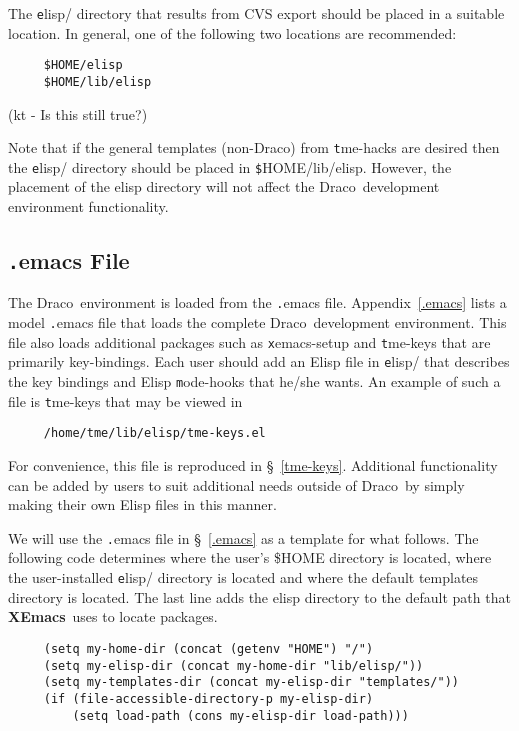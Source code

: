 \documentclass[11pt]{nmemo}
\newcommand{\comp}[1]{{\normalfont\texttt#1}}
\newcommand{\draco}{{\normalfont\sffamily Draco}}
\newcommand{\xemacs}{{\normalfont\bfseries XEmacs}}
\begin{document}
The \comp{elisp/} directory that results from CVS export should be
placed in a suitable location.  In general, one of the following two
locations are recommended:
\begin{verbatim}
     $HOME/elisp
     $HOME/lib/elisp
\end{verbatim}

(kt - Is this still true?) 

Note that if the general templates (non-\draco) from \comp{tme-hacks}
are desired then the \comp{elisp/} directory should be placed in
\comp{\$HOME/lib/elisp}.  However, the placement of the elisp
directory will not affect the \draco\ development environment
functionality.

\subsection{\comp{.emacs} File}
\label{sec:.emacs}

The \draco\ environment is loaded from the \comp{.emacs} file.
Appendix~\ref{.emacs} lists a model \comp{.emacs} file that loads the
complete \draco\ development environment.  This file also loads
additional packages such as \comp{xemacs-setup} and \comp{tme-keys}
that are primarily key-bindings.  Each user should add an Elisp file
in \comp{elisp/} that describes the key bindings and Elisp
\comp{mode-hooks} that he/she wants.  An example of such a file is
\comp{tme-keys} that may be viewed in
\begin{verbatim}
     /home/tme/lib/elisp/tme-keys.el
\end{verbatim}
For convenience, this file is reproduced in \S~\ref{tme-keys}.
Additional functionality can be added by users to suit additional
needs outside of \draco\ by simply making their own Elisp files in
this manner.

We will use the \comp{.emacs} file in \S~\ref{.emacs} as a template
for what follows.  The following code determines where the user's
\$HOME directory is located, where the 
user-installed \comp{elisp/} directory is located and where the
default templates directory is located.  The last line adds the elisp
directory to the default path that \xemacs\ uses to locate packages.

\begin{verbatim}
     (setq my-home-dir (concat (getenv "HOME") "/")
     (setq my-elisp-dir (concat my-home-dir "lib/elisp/"))
     (setq my-templates-dir (concat my-elisp-dir "templates/"))
     (if (file-accessible-directory-p my-elisp-dir)
         (setq load-path (cons my-elisp-dir load-path)))
\end{verbatim}
\end{document}
